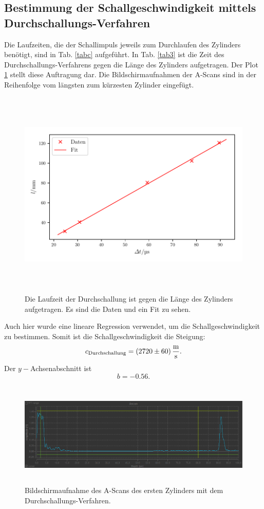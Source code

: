 \subsection{Bestimmung der Schallgeschwindigkeit mittels Durchschallungs-Verfahren}
Die Laufzeiten, die der Schallimpuls jeweils zum Durchlaufen des Zylinders benötigt,
sind in Tab. \ref{tabc} aufgeführt. In Tab. \ref{tab3} ist die Zeit des
Durchschallungs-Verfahrens gegen die Länge des Zylinders aufgetragen.
Der Plot \ref{fig:plot3} stellt diese Auftragung dar.
Die Bildschirmaufnahmen der A-Scans sind in der Reihenfolge vom längsten
zum kürzesten Zylinder eingefügt.


\begin{figure}
    \centering
    \includegraphics[width=15cm, height=10cm]{build/plot3.pdf}
    \caption{Die Laufzeit der Durchschallung ist gegen die Länge des Zylinders
    aufgetragen. Es sind die Daten und ein Fit zu sehen.}
    \label{fig:plot3}
\end{figure}
\noindent Auch hier wurde eine lineare Regression verwendet, um die Schallgeschwindigkeit zu bestimmen. Somit ist die Schallgeschwindigkeit die Steigung:
\begin{equation*}
    c_{\text{Durchschallung}} = \SI{2720 \pm 60}{\meter\per\second}.
\end{equation*}
\noindent Der $y-$Achsenabschnitt ist
\begin{equation*}
   b = \num{-0.56}. 
\end{equation*}

\begin{figure}
    \centering
    \includegraphics[width=15cm, height=5cm]{build/Messung3.1.png}
    \caption{Bildschirmaufnahme des A-Scans des ersten Zylinders mit dem Durchschallungs-Verfahren.}
    \label{fig:m3.1}
\end{figure}

